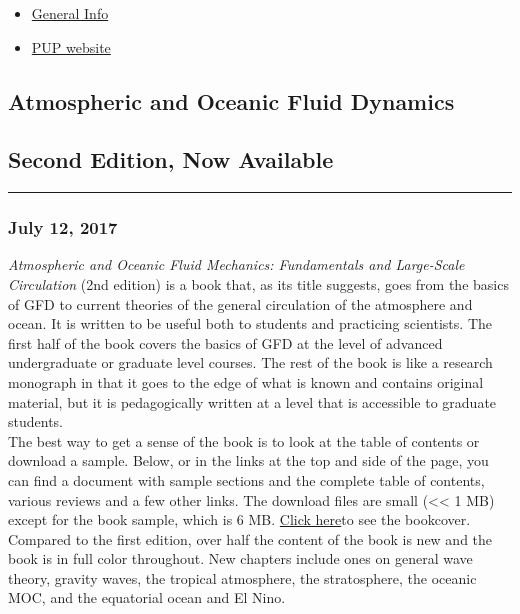 \begin{itemize}
\tightlist
\item
  \href{../climoce/index.html}{General Info}
\item
  \href{http://press.princeton.edu/titles/9636.html}{PUP website}
\end{itemize}

\subsection{Atmospheric and Oceanic Fluid
Dynamics}\label{atmospheric-and-oceanic-fluid-dynamics-2}

\subsection{Second Edition, Now
Available}\label{second-edition-now-available}

\begin{center}\rule{0.5\linewidth}{\linethickness}\end{center}

\subsubsection{\texorpdfstring{July 12, 2017\\
}{July 12, 2017 }}\label{july-12-2017}

\emph{Atmospheric and Oceanic Fluid Mechanics: Fundamentals and
Large-Scale Circulation} (2nd edition) is a book that, as its title
suggests, goes from the basics of GFD to current theories of the general
circulation of the atmosphere and ocean. It is written to be useful both
to students and practicing scientists. The first half of the book covers
the basics of GFD at the level of advanced undergraduate or graduate
level courses. The rest of the book is like a research monograph in that
it goes to the edge of what is known and contains original material, but
it is pedagogically written at a level that is accessible to graduate
students.\\[2\baselineskip]The best way to get a sense of the book is to
look at the table of contents or download a sample. Below, or in the
links at the top and side of the page, you can find a document with
sample sections and the complete table of contents, various reviews and
a few other links. The download files are small (\textless{}\textless{}
1 MB) except for the book sample, which is 6 MB.
\href{cover_aofd2.pdf}{Click here}to see the
bookcover.\\[2\baselineskip]Compared to the first edition, over half the
content of the book is new and the book is in full color throughout. New
chapters include ones on general wave theory, gravity waves, the
tropical atmosphere, the stratosphere, the oceanic MOC, and the
equatorial ocean and El Nino.\\[2\baselineskip]

